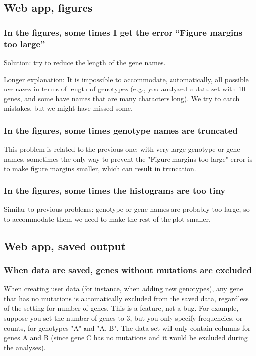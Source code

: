 \documentclass[a4paper,11pt]{article}
\begin{document}
\subsection{Web app, figures}
\subsubsection{In the figures, some times I get the error ``Figure margins too large''}

Solution: try to reduce the length of the gene names. 

Longer explanation: It is impossible to accommodate, automatically, all possible use cases in terms of length of genotypes (e.g., you analyzed a data set with 10 genes, and some have names that are many characters long). We try to catch mistakes, but we might have missed some.

\subsubsection{In the figures, some times genotype names are truncated}

This problem is related to the previous one: with very large genotype or gene names, sometimes the only way to prevent the "Figure margins too large" error is to make figure margins smaller, which can result in truncation. 


\subsubsection{In the figures, some times the histograms are too tiny}

Similar to previous problems: genotype or gene names are probably too large, so to accommodate them we need to make the rest of the plot smaller.

\subsection{Web app, saved output}
\subsubsection{When data are saved, genes without mutations are excluded}
\label{sec:number-genes-genes}

 When creating user data (for instance, when adding new genotypes), any gene that has no mutations is automatically excluded from the saved data, regardless of the setting for number of genes. This is a feature, not a bug. For example, suppose you set the number of genes to 3, but you only specify frequencies, or counts, for genotypes "A" and "A, B". The data set will only contain columns for genes A and B (since gene C has no mutations and it would be excluded during the analyses).
\end{document}
